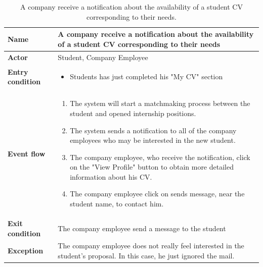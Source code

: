     \begin{table}[H]
        \centering
        \begin{tabular}{|l|p{11.9cm}|}
        \hline
        \textbf{Name}            & A company receive a notification about the availability of a student CV corresponding to their needs \\\hline
        \textbf{Actor}           & Student, Company Employee       \\\hline
        \textbf{Entry condition} &
        \begin{itemize}
              \item Students has just completed his "My CV" section
        \end{itemize}                                        \\\hline
        \textbf{Event flow}      &
        \begin{enumerate}[label=\arabic*.]
              \item The system will start a matchmaking process between the student and opened internship positions.
              \item The system sends a notification to all of the company employees who may be interested in the new student.
              \item The company employee, who receive the notification, click on the "View Profile" button to obtain more detailed information about his CV.
              \item The company employee click on sends message, near the student name, to contact him.
              
        \end{enumerate}            \\\hline
        \textbf{Exit condition}  & The company employee send a message to the student  \\\hline
        \textbf{Exception}       &  The company employee does not really feel interested in the student's proposal. In this case, he just ignored the mail.   \\\hline
        \end{tabular}
        \caption{A company receive a notification about the availability of a student CV corresponding to their needs.}
        \label{table:A company receive a notification about the availability of a student CV corresponding to their needs}
    \end{table}

